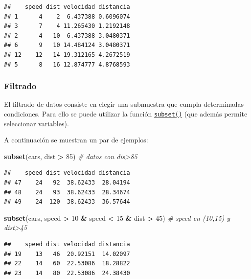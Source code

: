 \documentclass[]{book}
\newenvironment{Shaded}{\begin{snugshade}}{\end{snugshade}}
\newcommand{\CommentTok}[1]{\textcolor[rgb]{0.56,0.35,0.01}{\textit{#1}}}
\newcommand{\DecValTok}[1]{\textcolor[rgb]{0.00,0.00,0.81}{#1}}
\newcommand{\KeywordTok}[1]{\textcolor[rgb]{0.13,0.29,0.53}{\textbf{#1}}}
\newcommand{\NormalTok}[1]{#1}
\newcommand{\OperatorTok}[1]{\textcolor[rgb]{0.81,0.36,0.00}{\textbf{#1}}}
\newcommand{\StringTok}[1]{\textcolor[rgb]{0.31,0.60,0.02}{#1}}
\begin{document}
\begin{verbatim}
##    speed dist velocidad distancia
## 1      4    2  6.437388 0.6096074
## 3      7    4 11.265430 1.2192148
## 2      4   10  6.437388 3.0480371
## 6      9   10 14.484124 3.0480371
## 12    12   14 19.312165 4.2672519
## 5      8   16 12.874777 4.8768593
\end{verbatim}

\hypertarget{filtrado}{%
\subsubsection{Filtrado}\label{filtrado}}

El filtrado de datos consiste en
elegir una submuestra que cumpla determinadas condiciones. Para ello se
puede utilizar la función \href{https://www.rdocumentation.org/packages/base/versions/3.6.1/topics/subset}{\texttt{subset()}}
(que además permite seleccionar variables).

A continuación se muestran un par de ejemplos:

\begin{Shaded}
\begin{Highlighting}[]
\KeywordTok{subset}\NormalTok{(cars, dist }\OperatorTok{>}\StringTok{ }\DecValTok{85}\NormalTok{) }\CommentTok{# datos con dis>85}
\end{Highlighting}
\end{Shaded}

\begin{verbatim}
##    speed dist velocidad distancia
## 47    24   92  38.62433  28.04194
## 48    24   93  38.62433  28.34674
## 49    24  120  38.62433  36.57644
\end{verbatim}

\begin{Shaded}
\begin{Highlighting}[]
\KeywordTok{subset}\NormalTok{(cars, speed }\OperatorTok{>}\StringTok{ }\DecValTok{10} \OperatorTok{&}\StringTok{ }\NormalTok{speed }\OperatorTok{<}\StringTok{ }\DecValTok{15} \OperatorTok{&}\StringTok{ }\NormalTok{dist }\OperatorTok{>}\StringTok{ }\DecValTok{45}\NormalTok{) }\CommentTok{# speed en (10,15) y dist>45}
\end{Highlighting}
\end{Shaded}

\begin{verbatim}
##    speed dist velocidad distancia
## 19    13   46  20.92151  14.02097
## 22    14   60  22.53086  18.28822
## 23    14   80  22.53086  24.38430
\end{verbatim}
\end{document}
